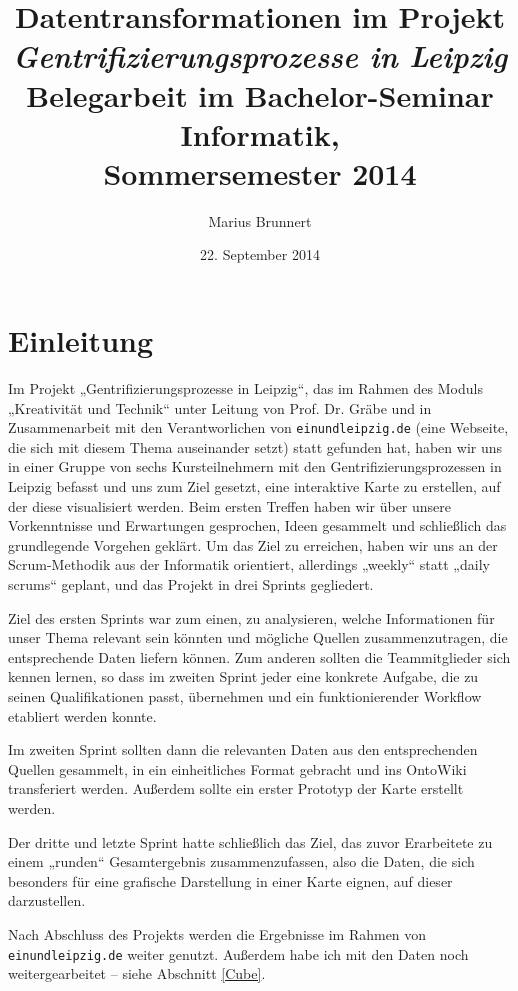 \documentclass[a4paper,11pt]{article}
\author{Marius Brunnert}
\title{{\bf Datentransformationen im Projekt\\[1em]
    \emph{Gentrifizierungsprozesse in Leipzig}}\\[2em] Belegarbeit im
  Bachelor-Seminar Informatik,\\ Sommersemester 2014\\[2em]}
\date{22. September 2014}
\begin{document}
\begin{titlepage}
\maketitle
\end{titlepage}
\tableofcontents
\clearpage

\section{Einleitung}

Im Projekt „Gentrifizierungsprozesse in Leipzig“, das im Rahmen des Moduls
„Kreativität und Technik“ unter Leitung von Prof. Dr. Gräbe und in
Zusammenarbeit mit den Verantworlichen von \texttt{einundleipzig.de} (eine
Webseite, die sich mit diesem Thema auseinander setzt) statt gefunden hat,
haben wir uns in einer Gruppe von sechs Kursteilnehmern mit den
Gentrifizierungsprozessen in Leipzig befasst und uns zum Ziel gesetzt, eine
interaktive Karte zu erstellen, auf der diese visualisiert werden. Beim ersten
Treffen haben wir über unsere Vorkenntnisse und Erwartungen gesprochen, Ideen
gesammelt und schließlich das grundlegende Vorgehen geklärt. Um das Ziel zu
erreichen, haben wir uns an der Scrum-Methodik aus der Informatik orientiert,
allerdings „weekly“ statt „daily scrums“ geplant, und das Projekt in drei
Sprints gegliedert.

Ziel des ersten Sprints war zum einen, zu analysieren, welche Informationen
für unser Thema relevant sein könnten und mögliche Quellen zusammenzutragen,
die entsprechende Daten liefern können. Zum anderen sollten die Teammitglieder
sich kennen lernen, so dass im zweiten Sprint jeder eine konkrete Aufgabe, die
zu seinen Qualifikationen passt, übernehmen und ein funktionierender Workflow
etabliert werden konnte.

Im zweiten Sprint sollten dann die relevanten Daten aus den entsprechenden
Quellen gesammelt, in ein einheitliches Format gebracht und ins OntoWiki
transferiert werden. Außerdem sollte ein erster Prototyp der Karte erstellt
werden.

Der dritte und letzte Sprint hatte schließlich das Ziel, das zuvor Erarbeitete
zu einem „runden“ Gesamtergebnis zusammenzufassen, also die Daten, die sich
besonders für eine grafische Darstellung in einer Karte eignen, auf dieser
darzustellen.

Nach Abschluss des Projekts werden die Ergebnisse im Rahmen von
\texttt{einundleipzig.de} weiter genutzt. Außerdem habe ich mit den Daten noch
weitergearbeitet -- siehe Abschnitt \ref{Cube}.
\end{document}

